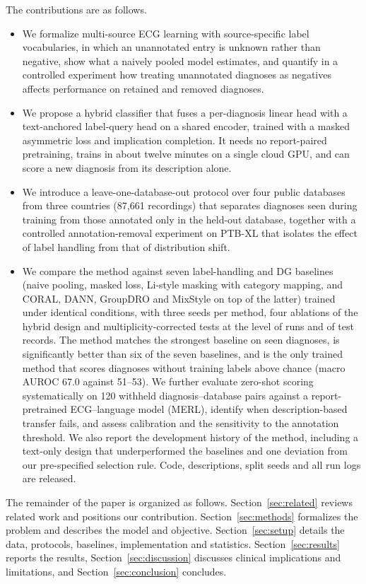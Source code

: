 The contributions are as follows.
\begin{itemize}
\item We formalize multi-source ECG learning with source-specific label vocabularies, in which an unannotated entry is unknown rather than negative, show what a naively pooled model estimates, and quantify in a controlled experiment how treating unannotated diagnoses as negatives affects performance on retained and removed diagnoses.
\item We propose a hybrid classifier that fuses a per-diagnosis linear head with a text-anchored label-query head on a shared encoder, trained with a masked asymmetric loss and implication completion. It needs no report-paired pretraining, trains in about twelve minutes on a single cloud GPU, and can score a new diagnosis from its description alone.
\item We introduce a leave-one-database-out protocol over four public databases from three countries (87{,}661 recordings) that separates diagnoses seen during training from those annotated only in the held-out database, together with a controlled annotation-removal experiment on PTB-XL that isolates the effect of label handling from that of distribution shift.
\item We compare the method against seven label-handling and DG baselines (naive pooling, masked loss, Li-style masking with category mapping, and CORAL, DANN, GroupDRO and MixStyle on top of the latter) trained under identical conditions, with three seeds per method, four ablations of the hybrid design and multiplicity-corrected tests at the level of runs and of test records. The method matches the strongest baseline on seen diagnoses, is significantly better than six of the seven baselines, and is the only trained method that scores diagnoses without training labels above chance (macro AUROC 67.0 against 51--53). We further evaluate zero-shot scoring systematically on 120 withheld diagnosis--database pairs against a report-pretrained ECG--language model (MERL), identify when description-based transfer fails, and assess calibration and the sensitivity to the annotation threshold. We also report the development history of the method, including a text-only design that underperformed the baselines and one deviation from our pre-specified selection rule. Code, descriptions, split seeds and all run logs are released.
\end{itemize}

The remainder of the paper is organized as follows. Section~\ref{sec:related} reviews related work and positions our contribution. Section~\ref{sec:methods} formalizes the problem and describes the model and objective. Section~\ref{sec:setup} details the data, protocols, baselines, implementation and statistics. Section~\ref{sec:results} reports the results, Section~\ref{sec:discussion} discusses clinical implications and limitations, and Section~\ref{sec:conclusion} concludes.
